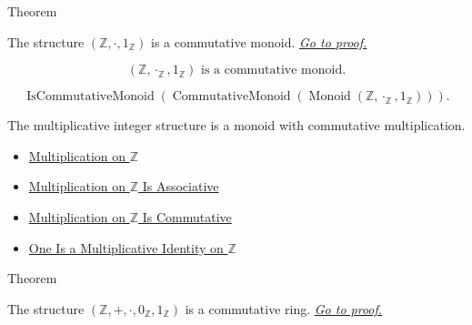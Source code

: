 \begin{theorembox}{Theorem}
\begin{theorem}
\label{thm:z-multiplicative-commutative-monoid}
The structure $(\mathbb{Z},\cdot,1_{\mathbb{Z}})$ is a commutative monoid.
\hyperref[prf:z-multiplicative-commutative-monoid]{\textit{Go to proof.}}
\end{theorem}
\end{theorembox}

\begin{remark*}
\[
(\mathbb{Z},\cdot_{\mathbb{Z}},1_{\mathbb{Z}})
\text{ is a commutative monoid.}
\]
\end{remark*}

\begin{remark*}
\[
\operatorname{IsCommutativeMonoid}(
\operatorname{CommutativeMonoid}(
\operatorname{Monoid}(\mathbb{Z},\cdot_{\mathbb{Z}},1_{\mathbb{Z}}))).
\]
\end{remark*}

\begin{remark*}[Interpretation]
The multiplicative integer structure is a monoid with commutative
multiplication.
\end{remark*}

\begin{dependencies}
\begin{itemize}
\item \hyperref[def:multiplication-on-z-classes]{Multiplication on $\mathbb{Z}$}
  \item \hyperref[thm:multiplication-on-z-associative]{Multiplication on $\mathbb{Z}$ Is Associative}
  \item \hyperref[thm:multiplication-on-z-commutative]{Multiplication on $\mathbb{Z}$ Is Commutative}
  \item \hyperref[thm:one-multiplicative-identity-on-z]{One Is a Multiplicative Identity on $\mathbb{Z}$}
\end{itemize}
\end{dependencies}

\begin{theorembox}{Theorem}
\begin{theorem}
\label{thm:z-commutative-ring}
The structure $(\mathbb{Z},+,\cdot,0_{\mathbb{Z}},1_{\mathbb{Z}})$ is a
commutative ring.
\hyperref[prf:z-commutative-ring]{\textit{Go to proof.}}
\end{theorem}
\end{theorembox}

